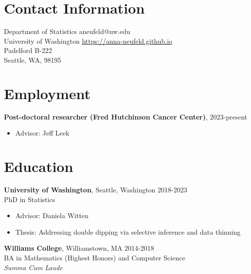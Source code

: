 \documentclass[margin, 10pt]{res} %
\begin{document}
\begin{resume}

 

\section{Contact Information}
Department of Statistics \hfill  aneufeld@uw.edu\\
University of Washington \hfill \href{https://anna-neufeld.github.io}{https://anna-neufeld.github.io} \\
Padelford B-222  \hfill \\
Seattle, WA, 98195



\section{Employment} 
{\textbf{Post-doctoral researcher (Fred Hutchinson Cancer Center)},} \hfill 2023-present
\begin{itemize}
\item Advisor: Jeff Leek
\end{itemize}

\section{Education} 

{\textbf{University of Washington},} Seattle, Washington \hfill 2018-2023 \\
PhD in Statistics
\begin{itemize}
\item Advisor: Daniela Witten
\item Thesis: Addressing double dipping via selective inference and data thinning 
\end{itemize}

{\textbf{Williams College}}, Williamstown, MA \hfill 2014-2018  \\
BA in Mathematics (Highest Honors) and Computer Science \\ 
\textit{Summa Cum Laude}%
 

\end{resume}
\end{document}
